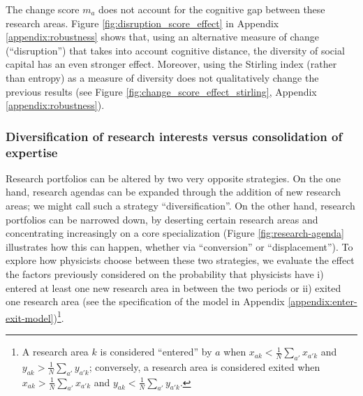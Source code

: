 \documentclass{article}
\begin{document}
The change score $m_a$ does not account for the cognitive gap between these research areas. Figure \ref{fig:disruption_score_effect} in Appendix \ref{appendix:robustness} shows that, using an alternative measure of change (``disruption'') that takes into account cognitive distance, the diversity of social capital has an even stronger effect. Moreover, using the Stirling index (rather than entropy) as a measure of diversity does not qualitatively change the previous results (see Figure \ref{fig:change_score_effect_stirling}, Appendix \ref{appendix:robustness}).
\subsubsection{Diversification of research interests versus consolidation of expertise}

Research portfolios can be altered by two very opposite strategies. On the one hand, research agendas can be expanded through the addition of new research areas; we might call such a strategy ``diversification''. On the other hand, research portfolios can be narrowed down, by deserting certain research areas and concentrating increasingly on a core specialization (Figure \ref{fig:research-agenda} illustrates how this can happen, whether via ``conversion'' or ``displacement''). To explore how physicists choose between these two strategies, we evaluate the effect the factors previously considered on the probability that physicists have i) entered at least one new research area in between the two periods or ii) exited one research area (see the specification of the model in Appendix \ref{appendix:enter-exit-model})\footnote{A research area $k$ is considered ``entered'' by $a$ when $x_{ak}<\frac{1}{N}\sum_{a'}x_{a'k}$ and $y_{ak}>\frac{1}{N}\sum_{a'}y_{a'k}$; conversely, a research area is considered exited when $x_{ak}>\frac{1}{N}\sum_{a'}x_{a'k}$ and $y_{ak}<\frac{1}{N}\sum_{a'}y_{a'k}$.}.


\end{document}
